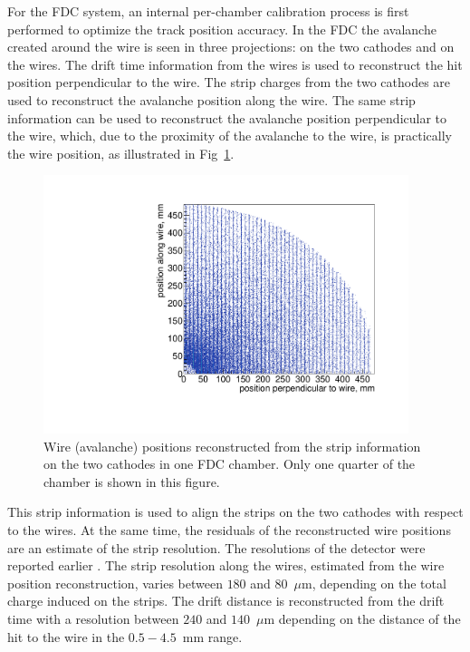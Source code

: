 For the FDC system, an internal per-chamber calibration process is first performed to optimize the track position accuracy.  
In the FDC the avalanche created around the wire is seen in three projections: on the two cathodes and on the wires.
The drift time information from the wires is used to reconstruct the hit position perpendicular to the wire.
The strip charges from the two cathodes are used to reconstruct the avalanche position along the wire. 
The same strip information can be used to reconstruct the avalanche position perpendicular to the wire,  which, due to the proximity of the avalanche to the wire, is practically the wire position, as illustrated in Fig~\ref{FDC_wires_from_strips}.
\begin{figure}[tbp]
\begin{center}
\includegraphics[width=0.95\textwidth]{figures/FDC_wires_from_strips1.pdf}  
\caption{\label{FDC_wires_from_strips} Wire (avalanche) positions reconstructed from the strip information on the two cathodes in one FDC chamber. Only one quarter of the chamber is shown in this figure.
}   
\end{center}  
\end{figure}
This strip information is used to align the strips on the two cathodes with respect to the wires. 
At the same time, the residuals of the reconstructed wire positions are an estimate of the strip resolution.
The resolutions of the detector were reported earlier \cite{FDC_NIM}. 
The strip resolution along the wires, estimated from the wire position reconstruction, varies between $180$ and $80$~$\mu$m, depending on the total charge induced on the strips. The drift distance is reconstructed from the drift time with a resolution between $240$ and $140$~$\mu$m
depending on the distance of the hit to the wire in the $0.5-4.5$~mm range.  

